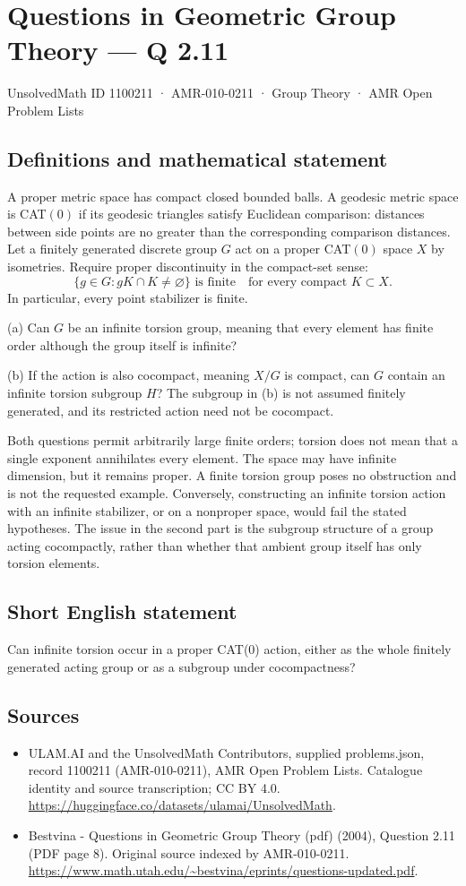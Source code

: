 \documentclass[11pt,a4paper]{article}
\begin{document}
\section*{Questions in Geometric Group Theory — Q 2.11}\label{1100211}
{\small UnsolvedMath ID 1100211 · AMR-010-0211 · Group Theory · AMR Open Problem Lists}
\subsection{Definitions and mathematical statement}
A proper metric space has compact closed bounded balls. A geodesic metric space is CAT$(0)$ if its geodesic triangles satisfy Euclidean comparison: distances between side points are no greater than the corresponding comparison distances. Let a finitely generated discrete group $G$ act on a proper CAT$(0)$ space $X$ by isometries. Require proper discontinuity in the compact-set sense:
\[
 \{g\in G:gK\cap K\ne\varnothing\}\text{ is finite}
 \quad\text{for every compact }K\subset X.
\]
In particular, every point stabilizer is finite.

(a) Can $G$ be an infinite torsion group, meaning that every element has finite order although the group itself is infinite?

(b) If the action is also cocompact, meaning $X/G$ is compact, can $G$ contain an infinite torsion subgroup $H$? The subgroup in (b) is not assumed finitely generated, and its restricted action need not be cocompact.

Both questions permit arbitrarily large finite orders; torsion does not mean that a single exponent annihilates every element. The space may have infinite dimension, but it remains proper. A finite torsion group poses no obstruction and is not the requested example. Conversely, constructing an infinite torsion action with an infinite stabilizer, or on a nonproper space, would fail the stated hypotheses. The issue in the second part is the subgroup structure of a group acting cocompactly, rather than whether that ambient group itself has only torsion elements.
\subsection{Short English statement}
Can infinite torsion occur in a proper CAT(0) action, either as the whole finitely generated acting group or as a subgroup under cocompactness?
\subsection{Sources}
\begin{itemize}
\item[S1] ULAM.AI and the UnsolvedMath Contributors, supplied problems.json, record 1100211 (AMR-010-0211), AMR Open Problem Lists. Catalogue identity and source transcription; CC BY 4.0.
\url{https://huggingface.co/datasets/ulamai/UnsolvedMath}.
\item[S2] Bestvina - Questions in Geometric Group Theory (pdf) (2004), Question 2.11 (PDF page 8). Original source indexed by AMR-010-0211.
\url{https://www.math.utah.edu/~bestvina/eprints/questions-updated.pdf}.
\end{itemize}
\end{document}
